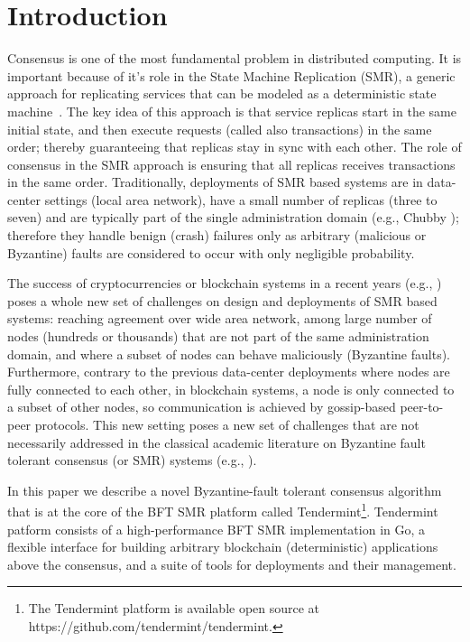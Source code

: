 \section{Introduction}
\label{sec:tendermint}

Consensus is one of the most fundamental problem in distributed computing. It is important because of it's role in the State Machine Replication (SMR), a generic approach for replicating services that can be modeled as a deterministic state machine~\cite{Lam78:cacm, Sch90:survey}. The key idea of this approach is that service replicas start in the same initial state, and then execute requests (called also transactions) in the same order; thereby guaranteeing that replicas stay in sync with each other. The role of consensus in the SMR approach is ensuring that all replicas receives transactions in the same order. 
Traditionally, deployments of SMR based systems are in data-center settings (local area network), have a small number of replicas (three to seven) and are typically part of the single administration domain (e.g., Chubby \cite{Bur:osdi06}); therefore they handle benign (crash) failures only as arbitrary (malicious or Byzantine) faults are considered to occur with only negligible probability.  

The success of cryptocurrencies or blockchain systems in a recent years (e.g., \cite{Nak2012:bitcoin, But2014:ethereum}) poses a whole new set of challenges on design and deployments of SMR based systems: reaching agreement over wide area network, among large number of nodes (hundreds or thousands) that are not part of the same administration domain, and where a subset of nodes can behave maliciously (Byzantine faults). Furthermore, contrary to the previous data-center deployments where nodes are fully connected to each other, in blockchain systems, a node is only connected to a subset of other nodes, so communication is achieved by gossip-based peer-to-peer protocols. This new setting poses a new set of challenges that are not necessarily addressed in the classical academic literature on Byzantine fault tolerant consensus (or SMR) systems (e.g., \cite{DLS88:jacm, CL02:tcs}).

In this paper we describe a novel Byzantine-fault tolerant consensus algorithm that is at the core of the BFT SMR platform called Tendermint\footnote{The Tendermint platform is available open source at https://github.com/tendermint/tendermint.}. Tendermint patform consists
of a high-performance BFT SMR implementation in Go, a flexible interface for building arbitrary blockchain (deterministic) applications above the consensus, and a suite of tools for deployments and their management.  

